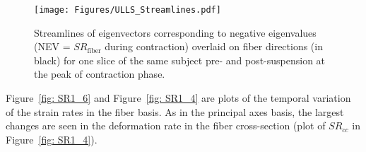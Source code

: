 \begin{figure}[htb]
\vspace{+0.2cm}
\centering
\texttt{[image: Figures/ULLS\_Streamlines.pdf]}
\caption[Streamlines of strain rate tensor negative eigenvectors for one slice of the same subject pre- and post-suspension at the peak of contraction phase]{Streamlines of eigenvectors corresponding to negative eigenvalues (NEV = $SR_\mathrm{fiber}$ during contraction) overlaid on fiber directions (in black) for one slice of the same subject pre- and post-suspension at the peak of contraction phase.}
\label{fig: SR1_5}
\end{figure}
 Figure~\ref{fig: SR1_6} and Figure~\ref{fig: SR1_4} are plots of the temporal variation of the strain rates in the fiber basis. 
 As in the principal axes basis, the largest changes are seen in the deformation rate in the fiber cross-section (plot of $SR_{cc}$ in Figure~\ref{fig: SR1_4}).

